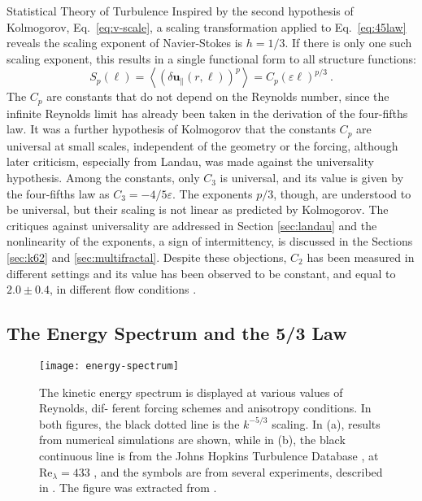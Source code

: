 \begin{chapter}{Statistical Theory of Turbulence}
Inspired by the second hypothesis of Kolmogorov, Eq.~\eqref{eq:v-scale},
a scaling transformation applied to Eq.~\eqref{eq:45law} reveals
the scaling exponent of Navier-Stokes is $h=1/3$.
If there is only one such scaling exponent, this results in a single functional
form to all structure functions:
\begin{equation} \label{eq:self-sim-zeta}
	S_p(\ell) = \left\langle\left(\delta \mathbf{u}_{ \|}(r, \ell)\right)^{p} \right\rangle
	= C_p (\varepsilon \ell)^{p/3} \ .
\end{equation}
The $C_p$ are constants that do not depend on the Reynolds number,
since the infinite Reynolds limit has already been taken in the derivation of the
four-fifths law.
It was a further hypothesis of Kolmogorov that the constants $C_p$
are universal at small scales, independent of the geometry or the forcing, although later criticism, especially from Landau, was made against the universality hypothesis.
Among the constants, only $C_3$ is universal, and its value
is given by the four-fifths law as $C_3 = -4/5 \varepsilon$. The exponents $p/3$, though, are understood to be universal, but their scaling is not linear as predicted by Kolmogorov.
The critiques against universality are addressed in Section \ref{sec:landau} and the nonlinearity of the exponents, a sign of intermittency, is discussed in the Sections \ref{sec:k62} and \ref{sec:multifractal}.
Despite these objections, $C_2$ has been measured in different settings and its value has been observed to be constant, and equal to $2.0 \pm 0.4$, in different flow conditions \parencite{sreenivasan1995universality}.

\subsection{The Energy Spectrum and the 5/3 Law}

\begin{figure}[t]
	\centering
	\texttt{[image: energy-spectrum]}
	\caption[The turbulent energy spectrum]
	{The kinetic energy spectrum is displayed at various values of Reynolds, dif-
	ferent forcing schemes and anisotropy conditions. In both figures, the black
	dotted line is the $k^{-5/3}$ scaling. In (a), results from numerical simulations are shown, while in (b), the black continuous line is from the Johns Hopkins Turbulence Database \parencite{jhtdb}, at $\mathrm{Re}_{\lambda} = 433$ \parencite{li2008}, and the symbols are from several experiments, described in \textcite{debue2018experimental}. The figure was extracted from \textcite{dubrulle2019beyond}.}
	\label{fig:energy-spectrum}
\end{figure}


\end{chapter}
